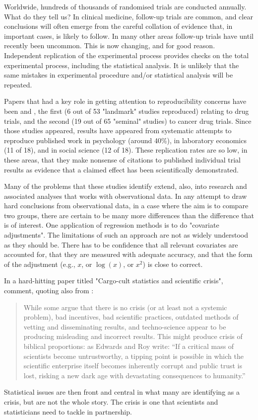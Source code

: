 Worldwide, hundreds of thousands of randomised trials are
conducted annually.  What do they tell us?  In clinical medicine,
follow-up trials are common, and clear conclusions will often
emerge from the careful collation of evidence that, in important
cases, is likely to follow.  In many other areas follow-up trials
have until recently been uncommon. This is now changing, and for
good reason.  Independent replication of the experimental process
provides checks on the total experimental process, including the
statistical analysis.  It is unlikely that the same mistakes in
experimental procedure and/or statistical analysis will be repeated.

Papers that had a key role in getting attention to reproducibility
concerns have been \citet{prinz2011believe} and 
\citep{begley2012drug}, the first (6 out of 53 "landmark" studies
reproduced)  relating to drug trials, and the second (19 out of 65 
"seminal" studies) to cancer drug trials.  Since those studies
appeared, results have appeared from systematic attempts to
reproduce  published work in psychology (around 40\%), in
laboratory economics (11 of 18), and in social science (12 of 18).
These replication rates are so low, in these areas, that they make
nonsense of citations to published individual trial results as
evidence that a claimed effect has been scientifically demonstrated.

Many of the problems that these studies identify extend, also,
into research and associated analyses that works with observational
data.  In any attempt to draw hard conclusions from observational
data, in a case where the aim is to compare two groups, there are
certain to be many more differences than the difference that is
of interest.  One application of regression methods is to do
"covariate adjustments".  The limitations of such an approach are
not as widely understood as they should be. There has
to be confidence that all relevant covariates are accounted for,
that they are measured with adequate accuracy, and that the form
of the adjustment (e.g., $x$, or $\log(x)$, or $x^2$) is close
to correct.

In a hard-hitting paper titled "Cargo-cult statistics and
scientific crisis", \citet{stark_saltelli_2018} comment,
quoting also from \citet{edwards_roy_2017}:
\begin{quote}
While some argue that there is no crisis (or at least not a systemic problem), bad incentives, bad scientific practices, outdated methods of vetting and disseminating results, and techno-science appear to be producing misleading and incorrect results. This might produce crisis of biblical proportions: as Edwards and Roy write: ``If a critical mass of scientists become untrustworthy, a tipping point is possible in which the scientific enterprise itself becomes inherently corrupt and public trust is lost, risking a new dark age with devastating consequences to humanity.''
\end{quote}
Statistical issues are then front and central in what many are identifying
as a crisis, but are not the whole story. The crisis is one that
scientists and statisticians need to tackle in partnership.

